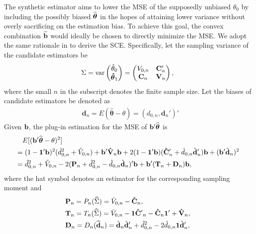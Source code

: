 \documentclass{article}
\begin{document}
The synthetic estimator aims to lower the MSE of the supposedly unbiased $\theta_0$ by including the possibly biased ${\widehat{\boldsymbol{\theta}}}$ in the hopes of attaining lower variance without overly sacrificing on the estimation bias.  To achieve this goal, the convex combination ${\widetilde {{\bf b}}}$ would ideally be chosen to directly minimize the MSE.  We adopt the same rationale in \citep{robinson1991blup, longford2006missing} to derive the SCE. Specifically, 
let the sampling variance of the candidate estimators be
\begin{equation}
\Sigma = \mbox{var} \begin{pmatrix} \hat\theta_0 \\ \boldsymbol {\hat\theta}_1  \end{pmatrix} =
\begin{pmatrix}     V_{0,n} & \mathbf C'_n\\
                             \mathbf C_n     & \mathbf V_n \end{pmatrix},
\end{equation}
where the small $n$ in the subscript denotes the finite sample size. 
Let the biases of candidate estimators be denoted as
\begin{equation}\begin{split}
    &\mathbf d_n = E(\boldsymbol {\hat\theta} - \theta) = (d_{0,n}, \mathbf d_n')'
\end{split}\end{equation}
Given ${\bf b}$, the plug-in estimation for the MSE of ${\bf b}'{\widehat{\boldsymbol{\theta}}}$ is
\begin{equation}\begin{split}\label{bMSE}
 &\quad E[( {\bf b}'{\widehat{\boldsymbol{\theta}}} - \theta)^2]  \\
	&= (1 - \mathbf 1' \mathbf b)^2  (\hat d_{0,n}^2+ \hat V_{0,n}) + \mathbf {b' \hat V}_n \mathbf b  + 2 (1-\mathbf{1'b} )(\mathbf{\hat C}'_n + \hat d_{0,n}\hat{\mathbf d}'_n ) \mathbf{b} + (\mathbf{b'}\hat{\mathbf{d}}_n)^2  \\
    &= \hat d_{0,n}^2 + \hat V_{0, n} - 2(\mathbf P_n + \hat d_{0,n}^2-\hat d_{0,n}\hat{\mathbf d}_n)' \mathbf b + \mathbf b'(\mathbf T_n + \mathbf D_n )\mathbf b,
\end{split}\end{equation}
where the hat symbol denotes an estimator for the corresponding sampling moment and 
\begin{displaymath}\begin{split}
&\mathbf P_n = P_n({\widehat\Sigma}) =\hat V_{0, n} - {\mathbf{\hat C}}_n, \\
&\mathbf T_n= T_n({\widehat\Sigma}) = \hat V_{0,n} - \mathbf{1 \hat C'}_n - \mathbf{\hat C}_n \mathbf{1'} + \mathbf{\hat V}_n, \\
&\mathbf D_n = D_n({\widehat {{\bf d}}}_n) = \hat{\mathbf{d}}_n \hat{\mathbf{d}}_n' +\hat d_{0,n}^2 -2\hat d_{0,n}\mathbf 1\hat{\mathbf d}'_n,
\end{split}\end{displaymath}
\end{document}
